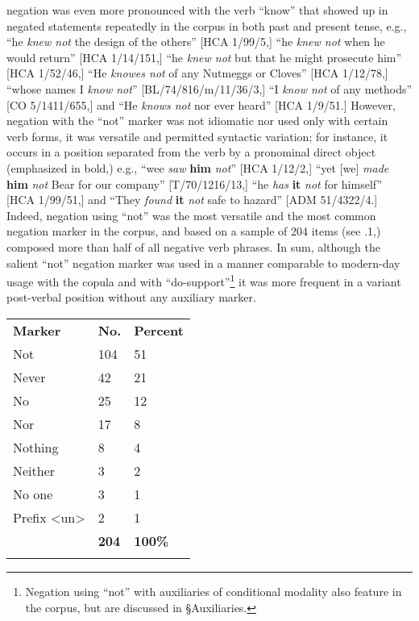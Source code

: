 negation was even more pronounced with the verb “know” that showed up in negated statements repeatedly in the corpus in both past and present tense, e.g., “he \textit{knew not} the design of the others” [HCA 1/99/5,] “he \textit{knew not} when he would return” [HCA 1/14/151,] “he \textit{knew not} but that he might prosecute him” [HCA 1/52/46,] “He \textit{knowes not} of any Nutmeggs or Cloves” [HCA 1/12/78,] “whose names I \textit{know not}” [BL/74/816/m/11/36/3,] “I \textit{know not} of any methods” [CO 5/1411/655,] and “He \textit{knows not} nor ever heard” [HCA 1/9/51.] However, negation with the “not” marker was not idiomatic nor used only with certain verb forms, it was versatile and permitted syntactic variation; for instance, it occurs in a position separated from the verb by a pronominal direct object (emphasized in bold,) e.g., “wee \textit{saw}\textbf{ }\textbf{him} \textit{not}” [HCA 1/12/2,] “yet [we] \textit{made} \textbf{him} \textit{not} Bear for our company” [T/70/1216/13,] “he \textit{has} \textbf{it} \textit{not} for himself” [HCA 1/99/51,] and “They \textit{found} \textbf{it} \textit{not} safe to hazard” [ADM 51/4322/4.] Indeed, negation using “not” was the most versatile and the most common negation marker in the corpus, and based on a sample of 204 items (see .1,) composed more than half of all negative verb phrases. In sum, although the salient “not” negation marker was used in a manner comparable to modern-day usage with the copula and with “do-support”\footnote{Negation using “not” with auxiliaries of conditional modality also feature in the corpus, but are discussed in §Auxiliaries.} it was more frequent in a variant post-verbal position without any auxiliary marker.

\begin{flushright}
\tablefirsthead{}

\tabletail{}
\tablelasttail{}
\begin{tabularx}{\textwidth}{XXX}

\lsptoprule

\textbf{Marker} & \textbf{No.} & \textbf{Percent}\\
Not & 104 & 51\\
Never & 42 & 21\\
No & 25 & 12\\
Nor & 17 & 8\\
Nothing & 8 & 4\\
Neither & 3 & 2\\
No one & 3 & 1\\
Prefix <un> & 2 & 1\\
& \textbf{204} & \textbf{100\%}\\
\lspbottomrule
\end{tabularx}
\end{flushright}

